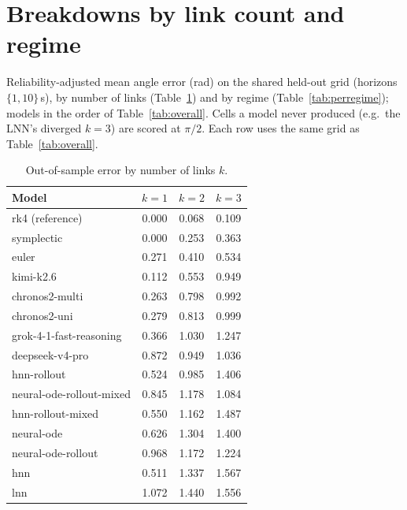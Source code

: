 \documentclass{article}
\begin{document}
\section{Breakdowns by link count and regime}
\label{app:breakdown}
Reliability-adjusted mean angle error (rad) on the shared held-out grid
(horizons $\{1,10\}$\,s), by number of links (Table~\ref{tab:perk}) and by regime
(Table~\ref{tab:perregime}); models in the order of Table~\ref{tab:overall}. Cells a model never produced (e.g.\
the LNN's diverged $k{=}3$) are scored at $\pi/2$. Each row uses the same grid as
Table~\ref{tab:overall}.

\begin{table}[tbp]
\centering\small
\caption{Out-of-sample error by number of links $k$.}
\label{tab:perk}
\begin{tabular}{lccc}
\toprule
Model & $k{=}1$ & $k{=}2$ & $k{=}3$ \\
\midrule
rk4 (reference) & 0.000 & 0.068 & 0.109 \\
symplectic & 0.000 & 0.253 & 0.363 \\
euler & 0.271 & 0.410 & 0.534 \\
kimi-k2.6 & 0.112 & 0.553 & 0.949 \\
chronos2-multi & 0.263 & 0.798 & 0.992 \\
chronos2-uni & 0.279 & 0.813 & 0.999 \\
grok-4-1-fast-reasoning & 0.366 & 1.030 & 1.247 \\
deepseek-v4-pro & 0.872 & 0.949 & 1.036 \\
hnn-rollout & 0.524 & 0.985 & 1.406 \\
neural-ode-rollout-mixed & 0.845 & 1.178 & 1.084 \\
hnn-rollout-mixed & 0.550 & 1.162 & 1.487 \\
neural-ode & 0.626 & 1.304 & 1.400 \\
neural-ode-rollout & 0.968 & 1.172 & 1.224 \\
hnn & 0.511 & 1.337 & 1.567 \\
lnn & 1.072 & 1.440 & 1.556 \\
\bottomrule
\end{tabular}
\end{table}
\end{document}
